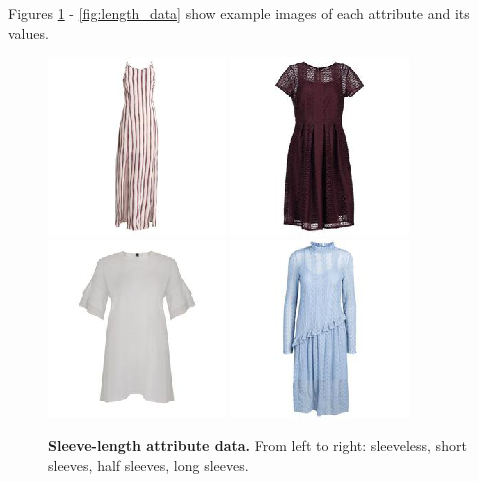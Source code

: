 \documentclass[12pt]{report}
\begin{document}
Figures \ref{fig:sleeve_data} - \ref{fig:length_data} show example images of each attribute and its values.

\begin{figure}[!h]
\centering
{\includegraphics[width=.23\linewidth]{03_analysis/data/sleeves_none}}
{\includegraphics[width=.23\linewidth]{03_analysis/data/sleeves_short}}
{\includegraphics[width=.23\linewidth]{03_analysis/data/sleeves_half}}
{\includegraphics[width=.23\linewidth]{03_analysis/data/sleeves_long}}
\caption{\label{fig:sleeve_data} \textbf{Sleeve-length attribute data.} From left to right: sleeveless, short sleeves, half sleeves, long sleeves.}


\end{figure}
\end{document}

